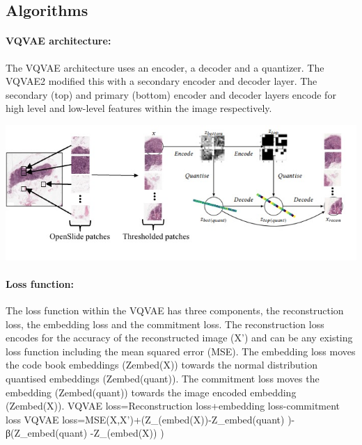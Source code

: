 \documentclass[review]{elsarticle}
\begin{document}
\subsection{Algorithms}
\paragraph{VQVAE architecture:} The VQVAE architecture uses an encoder, a decoder and a quantizer. The VQVAE2 modified this with a secondary encoder and decoder layer. The secondary (top) and primary (bottom) encoder and decoder layers encode for high level and low-level features within the image respectively.

\begin{center}
\includegraphics[width=1\linewidth]{Figures/Overview diagram VQVAE patch extraction and algorithm.jpeg}
\end{center}
    
\paragraph{Loss function:} The loss function within the VQVAE has three components, the reconstruction loss, the embedding loss and the commitment loss. The reconstruction loss encodes for the accuracy of the reconstructed image (X') and can be any existing loss function including the mean squared error (MSE). The embedding loss moves the code book embeddings (Zembed(X)) towards the normal distribution quantised embeddings (Zembed(quant)). The commitment loss moves the embedding (Zembed(quant)) towards the image encoded embedding (Zembed(X)).
    VQVAE loss=Reconstruction loss+embedding loss-commitment loss
    VQVAE loss=MSE(X,X')+(Z_(embed(X))-Z_embed(quant)  )-β(Z_embed(quant) -Z_(embed(X)) )
    
\end{document}
